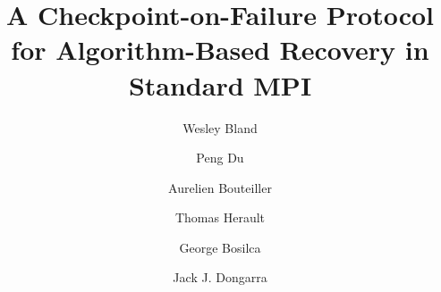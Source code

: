 \documentclass{llncs}
\begin{document}
\title{A Checkpoint-on-Failure Protocol for Algorithm-Based Recovery in Standard MPI}
\author{            Wesley Bland \and
                    Peng Du \and
                    Aurelien Bouteiller \and
                    Thomas Herault \and
                    George Bosilca \and
                    Jack J. Dongarra}

\maketitle










%

\pagebreak

\newcommand{\BIBdecl}{\setlength{\itemsep}{0.03\baselineskip}} 

%

\end{document}

